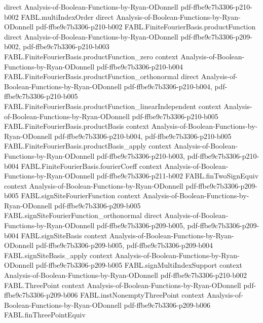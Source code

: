 \begin{theorem}
  {direct}
  {Analysis-of-Boolean-Functions-by-Ryan-ODonnell}
  {pdf-ffbe9c7b3306-p210-b002}
\proofstep
  {FABL.multiIndexOrder}
  {direct}
  {Analysis-of-Boolean-Functions-by-Ryan-ODonnell}
  {pdf-ffbe9c7b3306-p210-b002}
\proofstep
  {FABL.FiniteFourierBasis.productFunction}
  {direct}
  {Analysis-of-Boolean-Functions-by-Ryan-ODonnell}
  {pdf-ffbe9c7b3306-p209-b002,
    pdf-ffbe9c7b3306-p210-b003}
\proofstep
  {FABL.FiniteFourierBasis.productFunction_zero}
  {context}
  {Analysis-of-Boolean-Functions-by-Ryan-ODonnell}
  {pdf-ffbe9c7b3306-p210-b004}
\proofstep
  {FABL.FiniteFourierBasis.productFunction_orthonormal}
  {direct}
  {Analysis-of-Boolean-Functions-by-Ryan-ODonnell}
  {pdf-ffbe9c7b3306-p210-b004,
    pdf-ffbe9c7b3306-p210-b005}
\proofstep
  {FABL.FiniteFourierBasis.productFunction_linearIndependent}
  {context}
  {Analysis-of-Boolean-Functions-by-Ryan-ODonnell}
  {pdf-ffbe9c7b3306-p210-b005}
\proofstep
  {FABL.FiniteFourierBasis.productBasis}
  {context}
  {Analysis-of-Boolean-Functions-by-Ryan-ODonnell}
  {pdf-ffbe9c7b3306-p210-b004,
    pdf-ffbe9c7b3306-p210-b005}
\proofstep
  {FABL.FiniteFourierBasis.productBasis_apply}
  {context}
  {Analysis-of-Boolean-Functions-by-Ryan-ODonnell}
  {pdf-ffbe9c7b3306-p210-b003,
    pdf-ffbe9c7b3306-p210-b004}
\proofstep
  {FABL.FiniteFourierBasis.fourierCoeff}
  {context}
  {Analysis-of-Boolean-Functions-by-Ryan-ODonnell}
  {pdf-ffbe9c7b3306-p211-b002}
\proofstep
  {FABL.finTwoSignEquiv}
  {context}
  {Analysis-of-Boolean-Functions-by-Ryan-ODonnell}
  {pdf-ffbe9c7b3306-p209-b005}
\proofstep
  {FABL.signSiteFourierFunction}
  {context}
  {Analysis-of-Boolean-Functions-by-Ryan-ODonnell}
  {pdf-ffbe9c7b3306-p209-b005}
\proofstep
  {FABL.signSiteFourierFunction_orthonormal}
  {direct}
  {Analysis-of-Boolean-Functions-by-Ryan-ODonnell}
  {pdf-ffbe9c7b3306-p209-b005,
    pdf-ffbe9c7b3306-p209-b004}
\proofstep
  {FABL.signSiteBasis}
  {context}
  {Analysis-of-Boolean-Functions-by-Ryan-ODonnell}
  {pdf-ffbe9c7b3306-p209-b005,
    pdf-ffbe9c7b3306-p209-b004}
\proofstep
  {FABL.signSiteBasis_apply}
  {context}
  {Analysis-of-Boolean-Functions-by-Ryan-ODonnell}
  {pdf-ffbe9c7b3306-p209-b005}
\proofstep
  {FABL.signMultiIndexSupport}
  {context}
  {Analysis-of-Boolean-Functions-by-Ryan-ODonnell}
  {pdf-ffbe9c7b3306-p210-b002}
\proofstep
  {FABL.ThreePoint}
  {context}
  {Analysis-of-Boolean-Functions-by-Ryan-ODonnell}
  {pdf-ffbe9c7b3306-p209-b006}
\proofstep
  {FABL.instNonemptyThreePoint}
  {context}
  {Analysis-of-Boolean-Functions-by-Ryan-ODonnell}
  {pdf-ffbe9c7b3306-p209-b006}
\proofstep
  {FABL.finThreePointEquiv}

\end{theorem}
